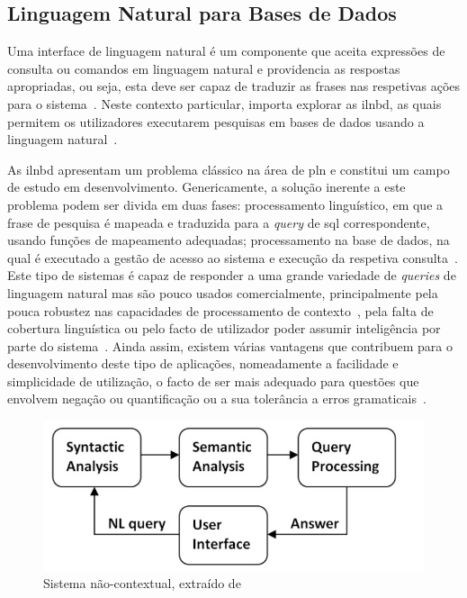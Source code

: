 \subsection{Linguagem Natural para Bases de Dados}
Uma interface de linguagem natural é um componente que aceita expressões de consulta ou comandos em linguagem natural e providencia as respostas apropriadas, ou seja, esta deve ser capaz de traduzir as frases nas respetivas ações para o sistema~\parencite{nlp}. Neste contexto particular, importa explorar as \gls{ilnbd}, as quais permitem os utilizadores executarem pesquisas em bases de dados usando a linguagem natural~\parencite{overview_nlidb_approaches_implementation_airline, novel_approach_building_generic_portable_contextual_nlidb_system}.

As \gls{ilnbd} apresentam um problema clássico na área de \gls{pln} e constitui um campo de estudo em desenvolvimento. Genericamente, a solução inerente a este problema podem ser divida em duas fases: processamento linguístico, em que a frase de pesquisa é mapeada e traduzida para a \textit{query} de \gls{sql} correspondente, usando funções de mapeamento adequadas; processamento na base de dados, na qual é executado a gestão de acesso ao sistema e execução da respetiva consulta~\parencite{overview_nlidb_approaches_implementation_airline}. Este tipo de sistemas é capaz de responder a uma grande variedade de \textit{queries} de linguagem natural mas são pouco usados comercialmente, principalmente pela pouca robustez nas capacidades de processamento de contexto~\parencite{novel_approach_towards_incorporating_context_processing_nlidb}, pela falta de cobertura linguística ou pelo facto de utilizador poder assumir inteligência por parte do sistema~\parencite{survey_nlidb, overview_nlidb_approaches_implementation_airline}. Ainda assim, existem várias vantagens que contribuem para o desenvolvimento deste tipo de aplicações, nomeadamente a facilidade e simplicidade de utilização, o facto de ser mais adequado para questões que envolvem negação ou quantificação ou a sua tolerância a erros gramaticais~\parencite{survey_nlidb, nlidb_brief_review, overview_nlidb_approaches_implementation_airline}.

\begin{figure}[!h]
    \centering
    \includegraphics[width=.6\textwidth]{ch03/assets/non_contextual_nlidb.jpg}
    \caption{Sistema  não-contextual, extraído de~\textcite{novel_approach_towards_incorporating_context_processing_nlidb}}
    \label{fig:noncontextual_nlidb}
\end{figure}

